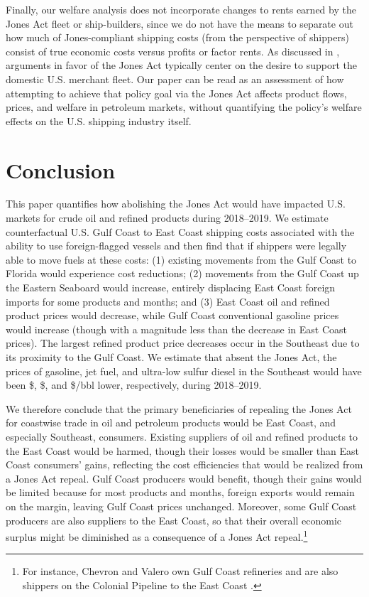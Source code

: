 \documentclass[12pt]{article}
\begin{document}
Finally, our welfare analysis does not incorporate changes to rents earned by the Jones Act fleet or ship-builders, since we do not have the means to separate out how much of Jones-compliant shipping costs (from the perspective of shippers) consist of true economic costs versus profits or factor rents. As discussed in \cite{melitz_econofact}, arguments in favor of the Jones Act typically center on the desire to support the domestic U.S. merchant fleet. Our paper can be read as an assessment of how attempting to achieve that policy goal via the Jones Act affects product flows, prices, and welfare in petroleum markets, without quantifying the policy's welfare effects on the U.S. shipping industry itself.


\section{Conclusion \label{sec:Conclusion}}

This paper quantifies how abolishing the Jones Act would have impacted U.S. markets for crude oil and refined products during 2018--2019. We estimate counterfactual U.S. Gulf Coast to East Coast shipping costs associated with the ability to use foreign-flagged vessels and then find that if shippers were legally able to move fuels at these costs: (1) existing movements from the Gulf Coast to Florida would experience cost reductions; (2) movements from the Gulf Coast up the Eastern Seaboard would increase, entirely displacing East Coast foreign imports for some products and months; and (3) East Coast oil and refined product prices would decrease, while Gulf Coast conventional gasoline prices would increase (though with a magnitude less than the decrease in East Coast prices). The largest refined product price decreases occur in the Southeast due to its proximity to the Gulf Coast. We estimate that absent the Jones Act, the prices of gasoline, jet fuel, and ultra-low sulfur diesel in the Southeast would have been \$\unskip, \$\unskip, and \$\unskip/bbl lower, respectively, during 2018--2019.

We therefore conclude that the primary beneficiaries of repealing the Jones Act for coastwise trade in oil and petroleum products would be East Coast, and especially Southeast, consumers. Existing suppliers of oil and refined products to the East Coast would be harmed, though their losses would be smaller than East Coast consumers' gains, reflecting the cost efficiencies that would be realized from a Jones Act repeal. Gulf Coast producers would benefit, though their gains would be limited because for most products and months, foreign exports would remain on the margin, leaving Gulf Coast prices unchanged. Moreover, some Gulf Coast producers are also suppliers to the East Coast, so that their overall economic surplus might be diminished as a consequence of a Jones Act repeal.\footnote{For instance, Chevron and Valero own Gulf Coast refineries and are also shippers on the Colonial Pipeline to the East Coast \citep{Reuters_Colonial}.}
\end{document}

